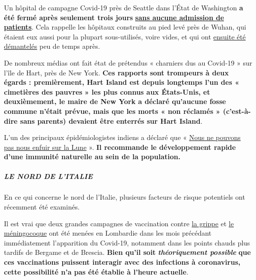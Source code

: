 Un hôpital de campagne Covid-19 près de Seattle dans l'État de
Washington \textbf{a été fermé après seulement trois jours}
\href{https://www.yahoo.com/news/armys-seattle-field-hospital-closes-165646379.html}{\textbf{sans
aucune admission de patients}}. Cela rappelle les hôpitaux construits au
pied levé près de Wuhan, qui étaient eux aussi pour la plupart
sous-utilisés, voire vides, et qui ont
\href{https://www.theguardian.com/world/2020/feb/12/what-chinas-empty-new-coronavirus-hospitals-say-about-its-secretive-system}{ensuite
été démantelés} peu de temps après.

De nombreux médias ont fait état de prétendus « charniers dus au
Covid-19 » sur l'île de Hart, près de New York. \textbf{Ces rapports
sont trompeurs à deux égards : premièrement, Hart Island est depuis
longtemps l'un des «} \textbf{cimetières des pauvres} \textbf{» les plus
connus aux États-Unis, et deuxièmement, le maire de New York a déclaré
qu'aucune fosse commune n'était prévue, mais que les morts « non
réclamés » (c'est-à-dire sans parents) devaient être enterrés sur Hart
Island}.

L'un des principaux épidémiologistes indiens a déclaré que «
\href{https://www.business-standard.com/article/current-affairs/we-cannot-run-away-to-the-moon-need-to-develop-herd-immunity-dr-muliyil-120040601232_1.html}{Nous
ne pouvons pas nous enfuir sur la Lune} ». \textbf{Il recommande le
développement rapide d'une immunité naturelle au sein de la population.}

\hypertarget{le-nord-de-litalie}{%
\subparagraph{\texorpdfstring{\textbf{LE NORD DE
L'ITALIE}}{LE NORD DE L'ITALIE}}\label{le-nord-de-litalie}}

En ce qui concerne le nord de l'Italie, plusieurs facteurs de risque
potentiels ont récemment été examinés.

Il est vrai que deux grandes campagnes de vaccination contre
\href{https://www.bergamonews.it/2019/10/21/vaccinazione-antinfluenzale-a-bergamo-ordinate-185-000-dosi-di-vaccino/332164/}{la
grippe} et
\href{https://www.bsnews.it/2020/01/18/meningite-vaccinate-34mila-persone-tra-brescia-e-bergamo/}{le
méningocoque} ont été menées en Lombardie dans les mois précédant
immédiatement l'apparition du Covid-19, notamment dans les points chauds
plus tardifs de Bergame et de Brescia. \textbf{Bien qu'il soit}
\emph{\textbf{théoriquement possible}} \textbf{que ces vaccinations
puissent interagir avec des infections à coronavirus, cette possibilité
n'a pas été établie à l'heure actuelle}.

